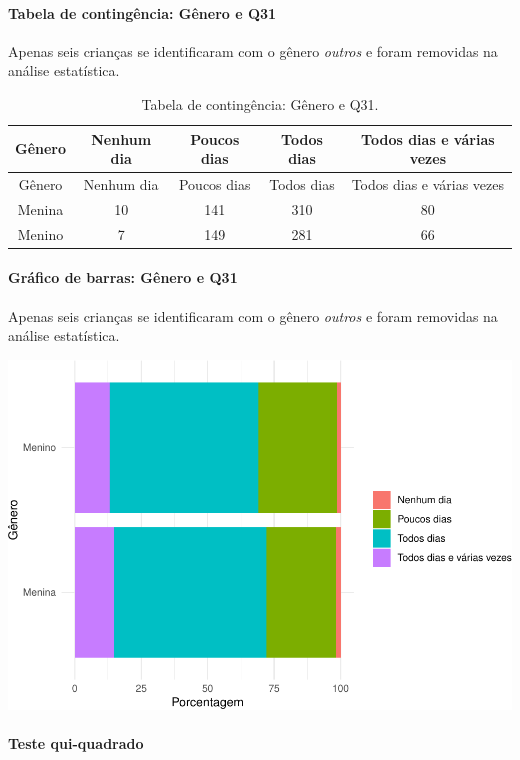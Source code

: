\documentclass[]{article}
\let\oldparagraph\paragraph
\renewcommand{\paragraph}[1]{\oldparagraph{#1}\mbox{}}
\begin{document}
\cleardoublepage

\hypertarget{tabela-de-continguxeancia-guxeanero-e-q31}{%
\paragraph{Tabela de contingência: Gênero e Q31}\label{tabela-de-continguxeancia-guxeanero-e-q31}}

Apenas seis crianças se identificaram com o gênero \emph{outros} e foram removidas na análise estatística.

\begin{longtable}[]{@{}ccccc@{}}
\caption{\label{tab:unnamed-chunk-1025}Tabela de contingência: Gênero e Q31.}\tabularnewline
\toprule
Gênero & Nenhum dia & Poucos dias & Todos dias & Todos dias e várias vezes\tabularnewline
\midrule
\endfirsthead
\toprule
Gênero & Nenhum dia & Poucos dias & Todos dias & Todos dias e várias vezes\tabularnewline
\midrule
\endhead
Menina & 10 & 141 & 310 & 80\tabularnewline
Menino & 7 & 149 & 281 & 66\tabularnewline
\bottomrule
\end{longtable}

\hypertarget{gruxe1fico-de-barras-guxeanero-e-q31}{%
\paragraph{Gráfico de barras: Gênero e Q31}\label{gruxe1fico-de-barras-guxeanero-e-q31}}

Apenas seis crianças se identificaram com o gênero \emph{outros} e foram removidas na análise estatística.

\begin{center}\includegraphics[width=0.75\linewidth]{relatorio_covid19_files/figure-latex/unnamed-chunk-1026-1} \end{center}

\hypertarget{teste-qui-quadrado-88}{%
\paragraph{Teste qui-quadrado}\label{teste-qui-quadrado-88}}
\end{document}
